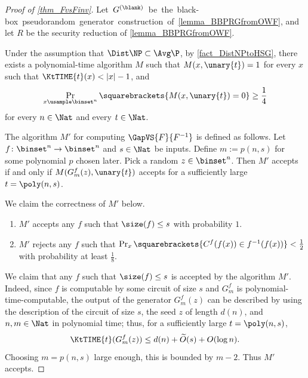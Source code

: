 \documentclass{toc}
\begin{document}
\begin{proof}
  [Proof of \cref{thm_FvsFinv}]  %
%
 \quad Let\ $G^{(\blank)}$\ be\ the\ black-box\ pseudorandom\ generator\
 construction\ of\ \cref{lemma_BBPRGfromOWF},
  and let $R$ be the security reduction of \cref{lemma_BBPRGfromOWF}.

  Under the assumption that $\Dist\NP \subset \Avg\P$,
  by \cref{fact_DistNPtoHSG},
  there exists a polynomial-time algorithm $M$ such that
  $M(x, \unary{t}) = 1$ for every $x$ such that $\KtTIME{t}(x) < |x| - 1$, and
  \[ \Pr_{x \usample \binset^n} \squarebrackets{ M(x, \unary{t}) = 0}
    \ge \frac{1}{4} \]
  for every $n \in \Nat$ and every $t \in \Nat$.

  The algorithm $M'$ for computing $\GapVS{F}{F^{-1}}$ is defined as follows.
  Let $f \colon \binset^n \to \binset^n$ and $s \in \Nat$ be inputs.
  Define $m := p(n, s)$ for some polynomial $p$ chosen later.
  Pick a random $z \in \binset^n$.
  Then
  $M'$ accepts if and only if
  $M(G_{m}^{f}(z), \unary{t})$ accepts for a sufficiently large $t = \poly(n, s)$.

  We claim the correctness of $M'$ below.
  \begin{claim}
    \hspace{0em}
    \begin{enumerate}
      \item
            $M'$ accepts
            any $f$ such that $\size(f) \le s$
            with probability $1$.
      \item
            $M'$ rejects
            any $f$ such that $\Pr_x \squarebrackets{ C^f(f(x)) \in f^{-1}(f(x)) } < \frac{1}{2}$
            with probability at least $\frac{1}{8}$.
    \end{enumerate}
  \end{claim}

  We claim that any $f$ such that $\size(f) \le s$ is accepted by the algorithm $M'$.
  Indeed,
  since $f$ is computable by some circuit of size $s$ and $G_{m}^f$ is polynomial-time-computable,
  the output of the generator $G_{m}^f(z)$ can be described
  by using
  the description of the circuit of size $s$, the seed $z$ of length $d(n)$, and $n, m \in \Nat$ in polynomial time;
  thus, for a sufficiently large $t = \poly(n, s)$,
  $$
    \KtTIME{t}(G_{m}^f(z)) \le d(n) + \widetilde{O}(s) + O(\log n).
  $$
  Choosing $m = p(n, s)$ large enough, this is bounded by $m - 2$.
  Thus $M'$ accepts.


\end{proof}
\end{document}
